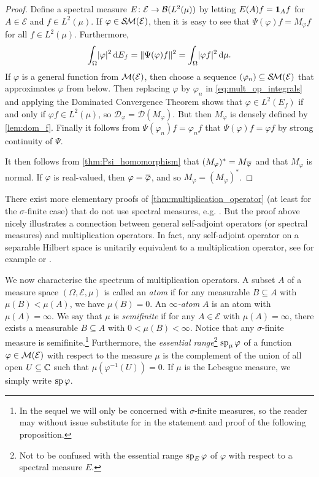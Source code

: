 \documentclass[article, a4paper, 11pt, oneside]{memoir}
\makeatletter
\let\phi\varphi
\numberwithin{equation}{chapter}
\newcommand{\calE}{\mathcal{E}}
\newcommand{\dom}{\mathcal{D}}
\theoremstyle{myexample}
\theoremstyle{myexample}
\theoremstyle{myexamplebreak}
\theoremstyle{myexamplebreak}
\theoremstyle{nonumberplain}
\newtheorem{proof}{\protect\@proof}
\theoremstyle{MyNonumberplain}
\newcommand{\@proof}{}
\renewcommand{\@proof}{Proof}%
\renewcommand{\@proof}{Bevis}%
\makeatother
\begin{document}
\begin{proof}
    Define a spectral measure $E \colon \calE \to \boundedop(L^2(\mu))$ by letting $E(A)f = \mathbf{1}_{A} f$ for $A \in \calE$ and $f \in L^2(\mu)$. If $\phi \in \simplemeas(\calE)$, then it is easy to see that $\Psi(\phi)f = M_\phi f$ for all $f \in L^2(\mu)$. Furthermore,
    \begin{equation}
        \label{eq:mult_op_integrals}
        \int_\Omega \abs{\phi}^2 \dif E_f
            = \norm{\Psi(\phi)f}^2
            = \int_\Omega \abs{\phi f}^2 \dif \mu.
    \end{equation}
    If $\phi$ is a general function from $\measurable(\calE)$, then choose a sequence $(\phi_n) \subseteq \simplemeas(\calE)$ that approximates $\phi$ from below. Then replacing $\phi$ by $\phi_n$ in \eqref{eq:mult_op_integrals} and applying the Dominated Convergence Theorem shows that $\phi \in L^2(E_f)$ if and only if $\phi f \in L^2(\mu)$, so $\dom_\phi = \dom(M_\phi)$. But then $M_\phi$ is densely defined by \cref{lem:dom_f}. Finally it follows from $\Psi(\phi_n)f = \phi_n f$ that $\Psi(\phi)f = \phi f$ by strong continuity of $\Psi$.
    
    It then follows from \cref{thm:Psi_homomorphism} that $(M_\phi)^* = M_{\conj{\phi}}$ and that $M_\phi$ is normal. If $\phi$ is real-valued, then $\phi = \conj{\phi}$, and so $M_\phi = (M_\phi)^*$.
\end{proof}
%
There exist more elementary proofs of \cref{thm:multiplication_operator} (at least for the $\sigma$-finite case) that do not use spectral measures, e.g. \textcite[Example~3.8]{schmudgen2012}. But the proof above nicely illustrates a connection between general self-adjoint operators (or spectral measures) and multiplication operators. In fact, any self-adjoint operator on a separable Hilbert space is unitarily equivalent to a multiplication operator, see for example \textcite[Theorem~VIII.4]{reedsimon1} or \textcite[Theorem~10.10]{hall2013}.

We now characterise the spectrum of multiplication operators. A subset $A$ of a measure space $(\Omega,\calE,\mu)$ is called an \emph{atom} if for any measurable $B \subseteq A$ with $\mu(B) < \mu(A)$, we have $\mu(B) = 0$. An \emph{$\infty$-atom} $A$ is an atom with $\mu(A) = \infty$. We say that $\mu$ is \emph{semifinite} if for any $A \in \calE$ with $\mu(A) = \infty$, there exists a measurable $B \subseteq A$ with $0 < \mu(B) < \infty$. Notice that any $\sigma$-finite measure is semifinite.\footnote{In the sequel we will only be concerned with $\sigma$-finite measures, so the reader may without issue substitute  for  in the statement and proof of the following proposition.} Furthermore, the \emph{essential range}\footnote{Not to be confused with the essential range $\essran_E \phi$ of $\phi$ with respect to a spectral measure $E$.} $\essran_\mu \phi$ of a function $\phi \in \measurable(\calE)$ with respect to the measure $\mu$ is the complement of the union of all open $U \subseteq \mathbb{C}$ such that $\mu(\phi^{-1}(U)) = 0$. If $\mu$ is the Lebesgue measure, we simply write $\essran \phi$.
\end{document}
